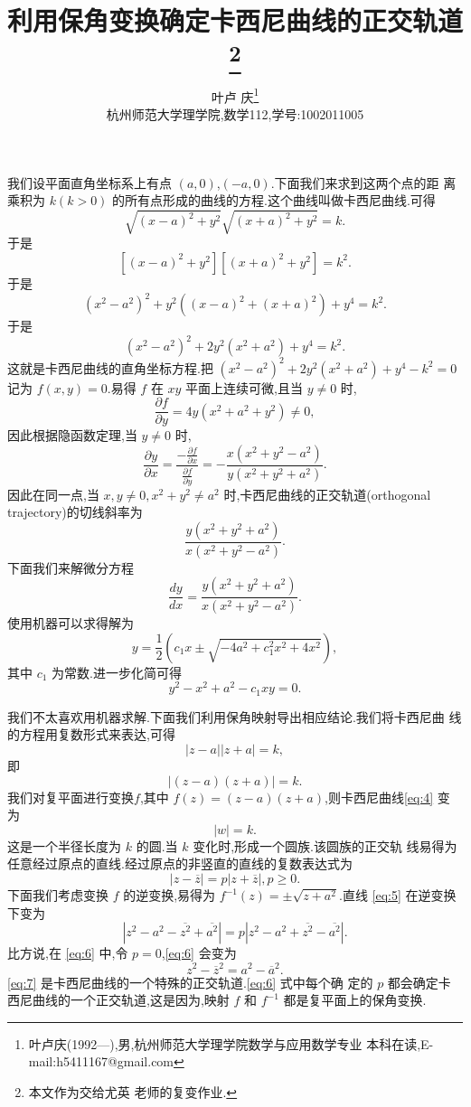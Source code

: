 \documentclass[a4paper]{article}
\newcommand{\pa}{\partial} \newcommand{\Om}{\Omega}
\begin{document}
\title{\huge{\bf{利用保角变换确定卡西尼曲线的正交轨道\footnote{本文作为交给尤英
        老师的复变作业.}}}} \author{\small{叶卢
    庆\footnote{叶卢庆(1992---),男,杭州师范大学理学院数学与应用数学专业
      本科在读,E-mail:h5411167@gmail.com}}\\{\small{杭州师范大学理学院,数学112,学号:1002011005}}}
\maketitle
我们设平面直角坐标系上有点 $(a,0)$,$(-a,0)$.下面我们来求到这两个点的距
离乘积为 $k(k>0)$ 的所有点形成的曲线的方程.这个曲线叫做卡西尼曲线.可得
$$
\sqrt{(x-a)^2+y^2}\sqrt{(x+a)^2+y^2}=k.
$$
于是
$$
[(x-a)^2+y^2][(x+a)^2+y^2]=k^2.
$$
于是
$$
(x^2-a^2)^2+y^2((x-a)^2+(x+a)^2)+y^4=k^2.
$$
于是
$$
(x^2-a^2)^2+2y^2(x^2+a^2)+y^4=k^2.
$$
这就是卡西尼曲线的直角坐标方程.把 $(x^2-a^2)^2+2y^2(x^2+a^2)+y^4-k^2=0$ 记为 $f(x,y)=0$.易得 $f$ 在
$xy$ 平面上连续可微,且当 $y\neq
0$ 时,
$$
\frac{\pa f}{\pa y}=4y(x^2+a^2+y^2)\neq 0,
$$
因此根据隐函数定理,当 $y\neq 0$ 时,
\begin{equation}
  \label{eq:1}
  \frac{\pa y}{\pa x}=\frac{- \frac{\pa f}{\pa x}}{\frac{\pa f}{\pa y}}=-\frac{x(x^2+y^2-a^2)}{y(x^2+y^2+a^2)}.
\end{equation}
因此在同一点,当 $x,y\neq 0,x^2+y^2\neq a^2$ 时,卡西尼曲线的正交轨道(orthogonal trajectory)的切线斜率为
\begin{equation}
  \label{eq:2}
  \frac{y(x^2+y^2+a^2)}{x(x^2+y^2-a^2)}.
\end{equation}
下面我们来解微分方程
$$
\frac{dy}{dx}=  \frac{y(x^2+y^2+a^2)}{x(x^2+y^2-a^2)}.
$$
使用机器可以求得解为
$$
y=\frac{1}{2}(c_1 x\pm\sqrt{-4 a^2+c_1^2 x^2+4 x^2}),
$$
其中 $c_1$ 为常数.进一步化简可得
$$
y^2-x^2+a^2-c_1xy=0.
$$
\newline

我们不太喜欢用机器求解.下面我们利用保角映射导出相应结论.我们将卡西尼曲
线的方程用复数形式来表达,可得
\begin{equation}
  \label{eq:3}
  |z-a||z+a|=k,
\end{equation}
即
\begin{equation}
  \label{eq:4}
  |(z-a)(z+a)|=k.
\end{equation}
我们对复平面进行变换$f$,其中 $f(z)=(z-a)(z+a)$,则卡西尼曲线\eqref{eq:4} 变
为
$$
|w|=k.
$$
这是一个半径长度为 $k$ 的圆.当 $k$ 变化时,形成一个圆族.该圆族的正交轨
线易得为任意经过原点的直线.经过原点的非竖直的直线的复数表达式为
\begin{equation}\label{eq:5}
|z-\overline{z}|=p|z+\overline{z}|,p\geq 0.
\end{equation}
下面我们考虑变换 $f$ 的逆变换,易得为 $f^{-1}(z)=\pm\sqrt{z+a^2}$.直线 \eqref{eq:5} 在逆变换下变为
\begin{equation}
  \label{eq:6}
  |z^2-a^2-\overline{z^2}+\overline{a^2}|=p|z^2-a^2+\overline{z^2}-\overline{a^2}|.
\end{equation}
比方说,在 \eqref{eq:6} 中,令 $p=0$,\eqref{eq:6} 会变为
\begin{equation}
  \label{eq:7}
  z^2-\overline{z}^2=a^2-\overline{a}^2.
\end{equation}
\eqref{eq:7} 是卡西尼曲线的一个特殊的正交轨道.\eqref{eq:6} 式中每个确
定的 $p$ 都会确定卡西尼曲线的一个正交轨道,这是因为,映射 $f$ 和
$f^{-1}$ 都是复平面上的保角变换.
\end{document}
